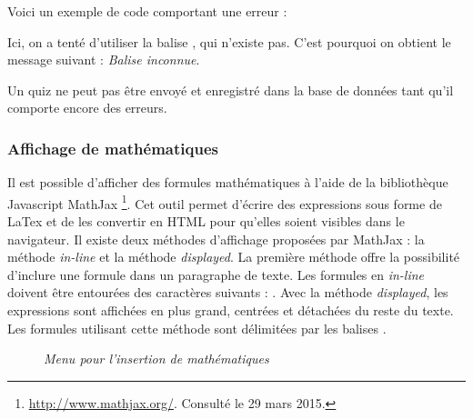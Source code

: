 \documentclass[a4paper,11pt,openany,oneside]{sphinxmanual}
\begin{document}
Voici un exemple de code comportant une erreur :

Ici, on a tenté d'utiliser la balise \code{*=}, qui n'existe pas. C'est pourquoi on obtient le message suivant : \emph{Balise inconnue}.

Un quiz ne peut pas être envoyé et enregistré dans la base de données tant qu'il comporte encore des erreurs.


\subsubsection{Affichage de mathématiques}
\label{doc-user:affichage-de-mathematiques}
Il est possible d'afficher des formules mathématiques à l'aide de la bibliothèque Javascript MathJax \footnote{
\href{http://www.mathjax.org/}{http://www.mathjax.org/}. Consulté le 29 mars 2015.
}. Cet outil permet d'écrire des expressions sous forme de LaTex et de les convertir en HTML pour qu'elles soient visibles dans le navigateur. Il existe deux méthodes d'affichage proposées par MathJax : la méthode \emph{in-line} et la méthode \emph{displayed}. La première méthode offre la possibilité d'inclure une formule dans un paragraphe de texte. Les formules en \emph{in-line} doivent être entourées des caractères suivants : . Avec la méthode \emph{displayed}, les expressions sont affichées en plus grand, centrées et détachées du reste du texte. Les formules utilisant cette méthode sont délimitées par les balises .
\begin{figure}[htbp]
\centering
\capstart

\caption{\emph{Menu pour l'insertion de mathématiques}}\end{figure}
\end{document}

